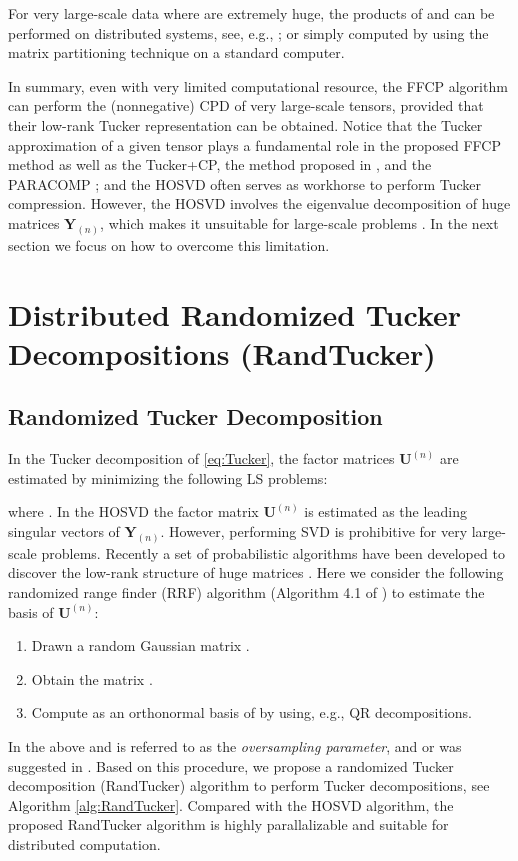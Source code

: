 \documentclass[10pt,twocolumn,twoside]{IEEEtran}
\newcommand{\tenmat}[2][n]{\ensuremath{{\mathbf{#2}}_{(#1)}}}
\newcommand{\matn}[2][n]{\ensuremath{\mathbf{#2}^{(#1)}}}
\begin{document}
For very large-scale data where  are extremely huge, the products of  and  can be performed on distributed systems, see, e.g., \cite{distMatProd2012}; or simply computed by using the matrix partitioning technique on a standard computer. 


In summary, even with very limited computational resource, the FFCP algorithm can perform the (nonnegative) CPD of very large-scale tensors, provided that their low-rank Tucker representation can be obtained. Notice that the Tucker approximation of a given tensor plays a fundamental role in the proposed FFCP method as well as the Tucker+CP, the method proposed in \cite{ComonNTF}, and the PARACOMP \cite{paracomp}; and the HOSVD often serves as workhorse to perform Tucker compression. However, the HOSVD involves the eigenvalue decomposition of huge matrices \tenmat{Y}, which makes it unsuitable for large-scale problems \cite{paracomp}.  In the next section we focus on how to overcome this limitation.



\section{Distributed Randomized Tucker Decompositions (RandTucker)}
\label{sec:DRandTucker}

\subsection{Randomized Tucker Decomposition}
\label{sec:RandTucker}
In the Tucker decomposition of \eqref{eq:Tucker}, the factor matrices \matn{U} are estimated by minimizing the following LS problems:

where .
In the HOSVD \cite{HOSVD2000} the factor matrix \matn{U} is estimated as the leading singular vectors of \tenmat{Y}. However, performing SVD is prohibitive for very large-scale problems.  Recently a set of probabilistic  algorithms have been developed to discover the low-rank structure of huge matrices \cite{siam_probLowRank}. Here we consider the following randomized range finder (RRF) algorithm (Algorithm 4.1 of \cite{siam_probLowRank}) to estimate the basis of \matn{U}:
\begin{enumerate}
\item Drawn a random Gaussian matrix .
\item Obtain the  matrix .
\item Compute  as an orthonormal basis of  by using, e.g., QR decompositions.
\end{enumerate}
In the above   and  is referred to as the \emph{oversampling parameter}, and  or  was suggested in \cite{siam_probLowRank}. Based on this procedure, we propose a randomized Tucker decomposition (RandTucker) algorithm to perform Tucker decompositions, see Algorithm \ref{alg:RandTucker}. Compared with the HOSVD algorithm, the proposed RandTucker algorithm is highly parallalizable and suitable for distributed computation.
\end{document}
